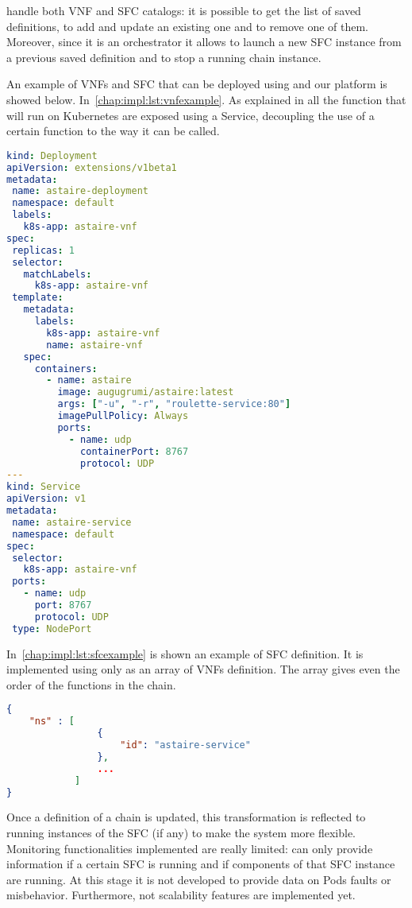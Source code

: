 \harbor{} handle both VNF and SFC catalogs: it is possible to get the list of
saved definitions, to add and update an existing one and to remove one of them.
Moreover, since it is an orchestrator it allows to launch a new SFC instance
from a previous saved definition and to stop a running chain instance.

An example of VNFs and SFC that can be deployed using \harbor{} and our platform
is showed below. In~\ref{chap:impl:lst:vnfexample}. As explained in  all the function that will run on Kubernetes are exposed
using a Service, decoupling the use of a certain function to the way it can be
called.
\begin{lstlisting}[caption={Example of VNF definition}, captionpos=b,
                   language=yaml, label=chap:impl:lst:vnfexample]
kind: Deployment
apiVersion: extensions/v1beta1
metadata:
 name: astaire-deployment
 namespace: default
 labels:
   k8s-app: astaire-vnf
spec:
 replicas: 1
 selector:
   matchLabels:
     k8s-app: astaire-vnf
 template:
   metadata:
     labels:
       k8s-app: astaire-vnf
       name: astaire-vnf
   spec:
     containers:
       - name: astaire
         image: augugrumi/astaire:latest
         args: ["-u", "-r", "roulette-service:80"]
         imagePullPolicy: Always
         ports:
           - name: udp
             containerPort: 8767
             protocol: UDP
---
kind: Service
apiVersion: v1
metadata:
 name: astaire-service
 namespace: default
spec:
 selector:
   k8s-app: astaire-vnf
 ports:
   - name: udp
     port: 8767
     protocol: UDP
 type: NodePort
\end{lstlisting}

In~\ref{chap:impl:lst:sfcexample} is shown an example of SFC definition. It is
implemented using only as an array of VNFs definition. The array gives even the
order of the functions in the chain.
\begin{lstlisting}[caption={Example of SFC definition}, captionpos=b,
                   language=json, label=chap:impl:lst:sfcexample]
{
    "ns" : [
                {
                    "id": "astaire-service"
                },
                ...
            ]
}
\end{lstlisting}

Once a definition of a chain is updated, this transformation is reflected to
running instances of the SFC (if any) to make the system more flexible.
Monitoring functionalities implemented are really limited: \harbor{} can only
provide information if a certain SFC is running and if components of that SFC
instance are running. At this stage it is not developed to provide data on Pods
faults or misbehavior. Furthermore, not scalability features are implemented
yet.

